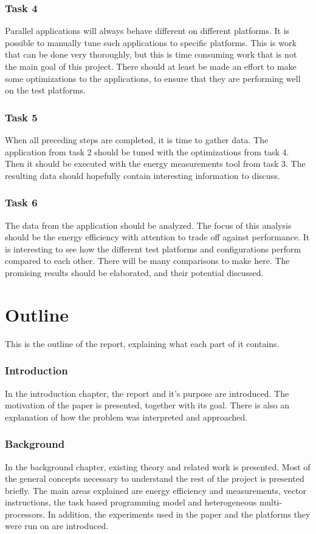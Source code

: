 \subsubsection{Task 4}
Parallel applications will always behave different on different platforms.
It is possible to manually tune such applications to specific platforms.
This is work that can be done very thoroughly, but this is time consuming work that is not the main goal of this project.
There should at least be made an effort to make some optimizations to the applications, to ensure that they are performing well on the test platforms.

\subsubsection{Task 5}
When all preceding steps are completed, it is time to gather data.
The application from task 2 should be tuned with the optimizations from task 4.
Then it should be executed with the energy measurements tool from task 3.
The resulting data should hopefully contain interesting information to discuss.

\subsubsection{Task 6}
The data from the application should be analyzed.
The focus of this analysis should be the energy efficiency with attention to trade off against performance.
It is interesting to see how the different test platforms and configurations perform compared to each other.
There will be many comparisons to make here.
The promising results should be elaborated, and their potential discussed.

\section{Outline}
This is the outline of the report, explaining what each part of it contains.

\subsubsection{Introduction}
In the introduction chapter, the report and it's purpose are introduced.
The motivation of the paper is presented, together with its goal.
There is also an explanation of how the problem was interpreted and approached.

\subsubsection{Background}
In the background chapter, existing theory and related work is presented.
Most of the general concepts necessary to understand the rest of the project is presented briefly.
The main areas explained are energy efficiency and measurements, vector instructions, the task based programming model and heterogeneous multi-processors.
In addition, the experiments used in the paper and the platforms they were run on are introduced.

